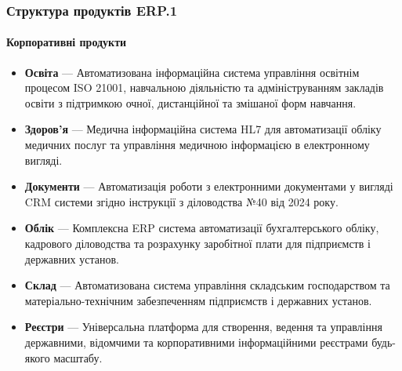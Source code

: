 \documentclass{article}
\begin{document}
\newpage
\subsubsection{Структура продуктів ERP.1}

\paragraph{Корпоративні продукти}
\begin{itemize}
    \item \textbf{Освіта} --- Автоматизована інформаційна система управління освітнім процесом ISO 21001, навчальною діяльністю та адмініструванням закладів освіти з підтримкою очної, дистанційної та змішаної форм навчання.
    \item \textbf{Здоров'я} --- Медична інформаційна система HL7 для автоматизації обліку медичних послуг та управління медичною інформацією в електронному вигляді.
    \item \textbf{Документи} --- Автоматизація роботи з електронними документами у вигляді CRM системи згідно інструкції з діловодства №40 від 2024 року.
    \item \textbf{Облік} --- Комплексна ERP система автоматизації бухгалтерського обліку, кадрового діловодства та розрахунку заробітної плати для підприємств і державних установ.
    \item \textbf{Склад} --- Автоматизована система управління складським господарством та матеріально-технічним забезпеченням підприємств і державних установ.
    \item \textbf{Реєстри} --- Універсальна платформа для створення, ведення та управління державними, відомчими та корпоративними інформаційними реєстрами будь-якого масштабу.
\end{itemize}
\end{document}
